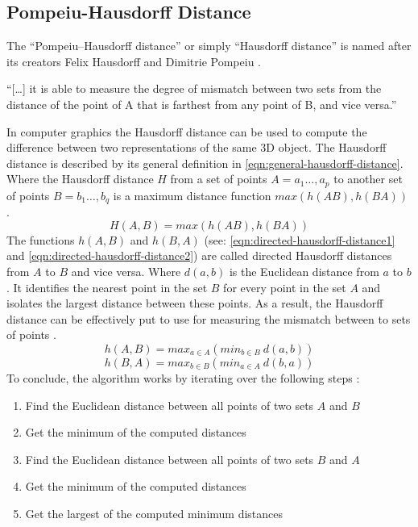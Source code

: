 \subsection{Pompeiu-Hausdorff Distance}
The ``Pompeiu–Hausdorff distance'' or simply ``Hausdorff distance'' is named after its creators Felix Hausdorff and Dimitrie Pompeiu \cite{birsanOneHundredYears2006}.
\begin{displayquote}
	``[\ldots] it is able to measure the degree of mismatch between two sets from the distance of the point of A that is farthest from any point of B, and vice versa.''
\end{displayquote}
In computer graphics the Hausdorff distance can be used to compute the difference between two representations of the same 3D object.
The Hausdorff distance is described by its general definition in \cref{eqn:general-hausdorff-distance}.
Where the Hausdorff distance $H$ from a set of points $A={a_{1}\ldots,a_{p}}$ to another set of points $B={b_{1}\ldots,b_{q}}$ is a maximum distance function $max(h(AB),h(BA))$ \cite{hausdorffGrundzuegeMengenlehre1978,simBrainVentricleDetection2016,gegoireHausdorffDistanceConvex1998}.
\begin{equation}\label{eqn:general-hausdorff-distance}
	H(A,B)=max(h(AB),h(BA))
\end{equation}
The functions $h(A,B)$ and $h(B,A)$ (see: \cref{eqn:directed-hausdorff-distance1} and \cref{eqn:directed-hausdorff-distance2}) are called directed Hausdorff distances from $A$ to $B$ and vice versa.
Where $d(a,b)$ is the Euclidean distance from $a$ to $b$.
It identifies the nearest point in the set $B$ for every point in the set $A$ and isolates the largest distance between these points.
As a result, the Hausdorff distance can be effectively put to use for measuring the mismatch between to sets of points \cite{hausdorffGrundzuegeMengenlehre1978,simBrainVentricleDetection2016,gegoireHausdorffDistanceConvex1998}.
\begin{equation}\label{eqn:directed-hausdorff-distance1}
	h(A,B)=max_{a \in A}(min_{b \in B}\ d(a,b))
\end{equation}
\begin{equation}\label{eqn:directed-hausdorff-distance2}
	h(B,A)=max_{b \in B}(min_{a \in A}\ d(b,a))
\end{equation}
To conclude, the algorithm works by iterating over the following steps \cite{hausdorffGrundzuegeMengenlehre1978,simBrainVentricleDetection2016,gegoireHausdorffDistanceConvex1998}:
\begin{enumerate}
	\item Find the Euclidean distance between all points of two sets $A$ and $B$
	\item Get the minimum of the computed distances
	\item Find the Euclidean distance between all points of two sets $B$ and $A$
	\item Get the minimum of the computed distances
	\item Get the largest of the computed minimum distances
\end{enumerate}


